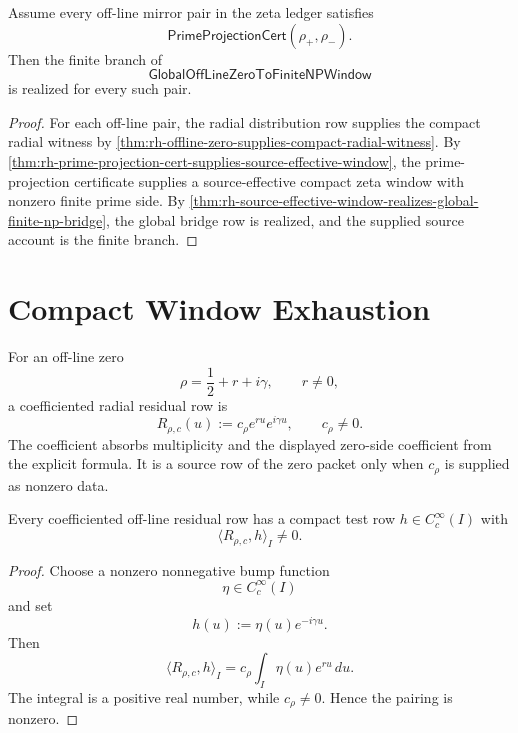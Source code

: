 \begin{corollary}
\label{cor:rh-explicit-formula-projection-realizes-global-bridge}
Assume every off-line mirror pair in the zeta ledger satisfies
$$
\mathsf{PrimeProjectionCert}(\rho_+,\rho_-).
$$
Then the finite branch of
$$
\mathsf{GlobalOffLineZeroToFiniteNPWindow}
$$
is realized for every such pair.
\end{corollary}

\begin{proof}
For each off-line pair, the radial distribution row supplies the compact
radial witness by
\autoref{thm:rh-offline-zero-supplies-compact-radial-witness}.  By
\autoref{thm:rh-prime-projection-cert-supplies-source-effective-window},
the prime-projection certificate supplies a source-effective compact
zeta window with nonzero finite prime side.
By
\autoref{thm:rh-source-effective-window-realizes-global-finite-np-bridge},
the global bridge row is realized, and the supplied source account is
the finite branch.
\end{proof}

\section{Compact Window Exhaustion}
\label{sec:rh-global-window-compact-window-exhaustion}

\begin{definition}
\label{def:rh-coefficiented-offline-residual-row}
For an off-line zero
$$
\rho=\frac12+r+i\gamma,
\qquad
r\ne0,
$$
a coefficiented radial residual row is
$$
R_{\rho,c}(u):=c_\rho e^{ru}e^{i\gamma u},
\qquad
c_\rho\ne0.
$$
The coefficient absorbs multiplicity and the displayed zero-side
coefficient from the explicit formula.  It is a source row of the zero
packet only when $c_\rho$ is supplied as nonzero data.
\end{definition}

\begin{lemma}
\label{lem:rh-coefficiented-radial-row-compact-test-readout}
Every coefficiented off-line residual row has a compact test row
$h\in C_c^\infty(I)$ with
$$
\langle R_{\rho,c},h\rangle_I\ne0.
$$
\end{lemma}

\begin{proof}
Choose a nonzero nonnegative bump function
$$
\eta\in C_c^\infty(I)
$$
and set
$$
h(u):=\eta(u)e^{-i\gamma u}.
$$
Then
$$
\langle R_{\rho,c},h\rangle_I
=
c_\rho\int_I\eta(u)e^{ru}\,du.
$$
The integral is a positive real number, while $c_\rho\ne0$.  Hence the
pairing is nonzero.
\end{proof}

